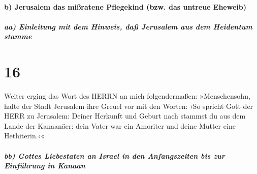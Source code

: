 \hypertarget{b-jerusalem-das-miuxdfratene-pflegekind-bzw.-das-untreue-eheweib}{%
\paragraph{b) Jerusalem das mißratene Pflegekind (bzw. das untreue
Eheweib)}\label{b-jerusalem-das-miuxdfratene-pflegekind-bzw.-das-untreue-eheweib}}

\hypertarget{aa-einleitung-mit-dem-hinweis-dauxdf-jerusalem-aus-dem-heidentum-stamme}{%
\subparagraph{aa) Einleitung mit dem Hinweis, daß Jerusalem aus dem
Heidentum
stamme}\label{aa-einleitung-mit-dem-hinweis-dauxdf-jerusalem-aus-dem-heidentum-stamme}}

\hypertarget{section-15}{%
\section{16}\label{section-15}}

Weiter erging das Wort des HERRN an mich folgendermaßen:
»Menschensohn, halte der Stadt Jerusalem ihre Greuel vor
mit den Worten: ›So spricht Gott der HERR zu Jerusalem:
Deiner Herkunft und Geburt nach stammst du aus dem Lande der Kanaanäer:
dein Vater war ein Amoriter und deine Mutter eine Hethiterin.‹«

\hypertarget{bb-gottes-liebestaten-an-israel-in-den-anfangszeiten-bis-zur-einfuxfchrung-in-kanaan}{%
\subparagraph{bb) Gottes Liebestaten an Israel in den Anfangszeiten bis
zur Einführung in
Kanaan}\label{bb-gottes-liebestaten-an-israel-in-den-anfangszeiten-bis-zur-einfuxfchrung-in-kanaan}}


